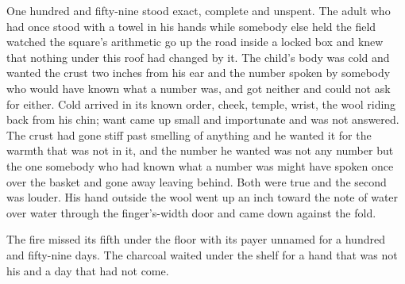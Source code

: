 One hundred and fifty-nine stood exact, complete and unspent. The adult who had once stood with a towel in his hands while somebody else held the field watched the square's arithmetic go up the road inside a locked box and knew that nothing under this roof had changed by it. The child's body was cold and wanted the crust two inches from his ear and the number spoken by somebody who would have known what a number was, and got neither and could not ask for either. Cold arrived in its known order, cheek, temple, wrist, the wool riding back from his chin; want came up small and importunate and was not answered. The crust had gone stiff past smelling of anything and he wanted it for the warmth that was not in it, and the number he wanted was not any number but the one somebody who had known what a number was might have spoken once over the basket and gone away leaving behind. Both were true and the second was louder. His hand outside the wool went up an inch toward the note of water over water through the finger's-width door and came down against the fold.

The fire missed its fifth under the floor with its payer unnamed for a hundred and fifty-nine days. The charcoal waited under the shelf for a hand that was not his and a day that had not come.
